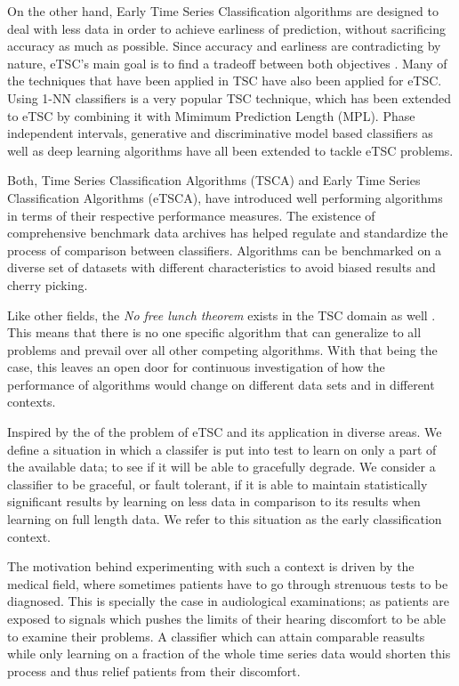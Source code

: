 On the other hand, Early Time Series Classification algorithms are designed to deal with less data in order to achieve earliness of prediction, without sacrificing accuracy as much as possible.
Since accuracy and earliness are contradicting by nature, eTSC's main goal is to find a tradeoff between both objectives \cite{gupta2020fault}.
Many of the techniques that have been applied in TSC have also been applied for eTSC.
Using 1-NN classifiers is a very popular TSC technique, which has been extended to eTSC by combining it with Mimimum Prediction Length (MPL)\cite{xing2012early}.
Phase independent intervals\cite{ghalwash2012early,he2015early}, generative and discriminative model based classifiers\cite{li2014early,cheng2018predicting} as well as deep learning algorithms \cite{huang2018multivariate, russwurm2019end}
have all been extended to tackle eTSC problems.


Both, Time Series Classification Algorithms (TSCA) and Early Time Series Classification Algorithms (eTSCA), have introduced well performing algorithms in terms of their respective performance measures.
The existence of comprehensive benchmark data archives \cite{UCRArchive2018,bagnall2018uea} has helped regulate and standardize the process of comparison between classifiers.
Algorithms can be benchmarked on a diverse set of datasets with different characteristics to avoid biased results and cherry picking.

Like other fields, the \emph{No free lunch theorem} exists in the TSC domain as well \cite{bagnall2017great,bostrom2018shapelet}.
This means that there is no one specific algorithm that can generalize to all problems and prevail over all other competing algorithms.
With that being the case, this leaves an open door for continuous investigation of how the performance of algorithms would change on different data sets and in different contexts.

Inspired by the of the problem of eTSC and its application in diverse areas.
We define a situation in which a classifer is put into test to learn on only a part of the available data; to see if it will be able to gracefully degrade.
We consider a classifier to be graceful, or fault tolerant, if it is able to maintain statistically significant results by learning on less data in comparison to its results when learning on full length data.
We refer to this situation as the early classification context.

The motivation behind experimenting with such a context is driven by the medical field, where sometimes patients have to go through strenuous tests to be diagnosed.
This is specially the case in audiological examinations; as patients are exposed to signals which pushes the limits of their hearing discomfort to be able to examine their problems.
A classifier which can attain comparable reasults while only learning on a fraction of the whole time series data would shorten this process and thus relief patients from their discomfort.

